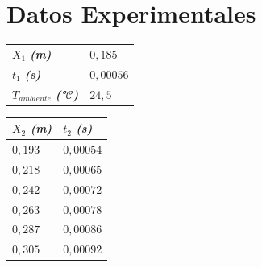 \documentclass[twocolumn, 12pt]{article}
\newcommand{\bolditalic}[1]{\textbf{\textit{#1}}}
\begin{document}
\section{Datos Experimentales}

\begin{table}[H]
    \begin{center}
        \begin{tabularx}{.9\linewidth}{|>{\centering\arraybackslash}X|>{\centering\arraybackslash}X|}
            \hline
            \multicolumn{2}{|c|}{Constantes}                         \\\hline
            $X_{1}$ \bolditalic{(m)}                     & $0,185$   \\\hline
            $t_{1}$ \bolditalic{(s)}                     & $0,00056$ \\\hline
            $T_{ambiente}$ \bolditalic{(°$\mathcal{C}$)} & $24,5$    \\\hline
        \end{tabularx}
    \end{center}
\end{table}

\begin{table}[H]
    \begin{center}
        \begin{tabularx}{.9\linewidth}{|>{\centering\arraybackslash}X|>{\centering\arraybackslash}X|}
            \hline
            $X_{2}$ \bolditalic{(m)} & $t_{2}$ \bolditalic{(s)} \\\hline
            $0,193$                  & $0,00054$                \\\hline
            $0,218$                  & $0,00065$                \\\hline
            $0,242$                  & $0,00072$                \\\hline
            $0,263$                  & $0,00078$                \\\hline
            $0,287$                  & $0,00086$                \\\hline
            $0,305$                  & $0,00092$                \\\hline
        \end{tabularx}
    \end{center}
\end{table}
\end{document}

